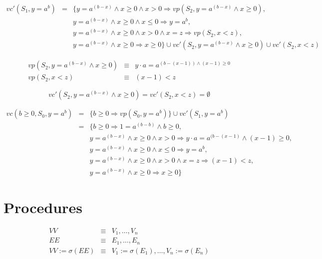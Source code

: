 \documentclass[12pt, a4paper]{book}
\begin{document}
  \begin{eqnarray*}
      vc'(S_{1}, y = a^{b}) & = & \{ y = a^{(b-x)} \land x \ge 0 \land x > 0 \Rightarrow vp(S_{2}, y=a^{(b-x)} \land x \ge 0), \\
      & & y = a^{(b-x)} \land x \ge 0 \land x \le 0 \Rightarrow y = a^{b}, \\
      & & y = a^{(b-x)} \land x \ge 0 \land x > 0 \land x = z \Rightarrow vp(S_{2}, x < z), \\
      & & y = a^{(b-x)} \land x \ge 0 \Rightarrow x \ge 0 \} \cup vc'(S_{2}, y = a^{(b-x)} \land x \ge 0) \cup vc'(S_{2}, x < z)
  \end{eqnarray*}

  \begin{eqnarray*}
      vp(S_{2}, y = a^{(b-x)} \land x \ge 0) & \equiv & y \cdot a = a^{(b-(x-1)) \land (x-1) \ge 0} \\
      vp(S_{2}, x < z) & \equiv & (x-1) < z
  \end{eqnarray*}

  $$vc'(S_{2}, y = a^{(b-x)} \land x \ge 0) = vc'(S_{2}, x < z ) = \emptyset $$

  \begin{eqnarray*}
      vc(b \ge 0, S_{0}, y = a^{b}) & = & \{ b \ge 0 \Rightarrow vp(S_{0}, y=a^{b})\} \cup vc'(S_{1}, y=a^{b}) \\
      & = & \{ b \ge 0 \Rightarrow 1 = a^{(b-b)} \land b \ge 0, \\
      & & y = a^{(b-x)} \land x \ge 0 \land x > 0 \Rightarrow y \cdot a = a^{(b-(x-1)} \land (x-1) \ge 0, \\
      & & y = a^{(b-x)} \land x \ge 0 \land x \le 0 \Rightarrow y = a^{b}, \\
      & & y = a^{(b-x)} \land x \ge 0 \land x > 0 \land x = z \Rightarrow (x-1) < z, \\
      & & y = a^{(b-x)} \land x \ge 0 \Rightarrow x \ge 0 \}
  \end{eqnarray*}
  \section{Procedures}
  \label{sec:Procedures}

  

  \begin{eqnarray*}
      VV & \equiv & V_{1}, \ldots, V_{n} \\
      EE & \equiv & E_{1}, \ldots, E_{n} \\
      VV := \sigma(EE) & \equiv & V_{1} := \sigma(E_{1}), \ldots, V_{n} := \sigma(E_{n})
  \end{eqnarray*}
\end{document}
